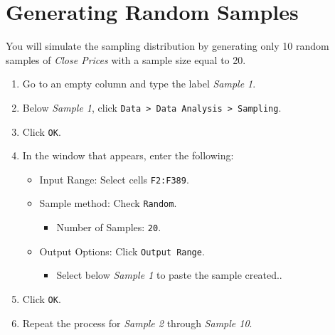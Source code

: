 \documentclass[
]{book}
\providecommand{\tightlist}{%
  \setlength{\itemsep}{0pt}\setlength{\parskip}{0pt}}
\begin{document}
\hypertarget{generating-random-samples}{%
\section{Generating Random Samples}\label{generating-random-samples}}

You will simulate the sampling distribution by generating only 10 random samples of \emph{Close Prices} with a sample size equal to 20.

\begin{enumerate}
\def\labelenumi{\arabic{enumi}.}
\tightlist
\item
  Go to an empty column and type the label \emph{Sample 1}.
\item
  Below \emph{Sample 1}, click \texttt{Data\ \textgreater{}\ Data\ Analysis\ \textgreater{}\ Sampling}.
\item
  Click \texttt{OK}.
\item
  In the window that appears, enter the following:

  \begin{itemize}
  \tightlist
  \item
    Input Range: Select cells \texttt{F2:F389}.
  \item
    Sample method: Check \texttt{Random}.

    \begin{itemize}
    \tightlist
    \item
      Number of Samples: \texttt{20}.
    \end{itemize}
  \item
    Output Options: Click \texttt{Output\ Range}.

    \begin{itemize}
    \tightlist
    \item
      Select below \emph{Sample 1} to paste the sample created..
    \end{itemize}
  \end{itemize}
\item
  Click \texttt{OK}.
\item
  Repeat the process for \emph{Sample 2} through \emph{Sample 10}.
\end{enumerate}
\end{document}
